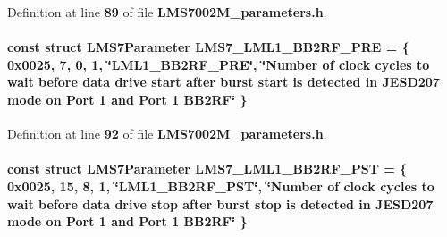 Definition at line {\bf 89} of file {\bf L\+M\+S7002\+M\+\_\+parameters.\+h}.

\paragraph[{L\+M\+S7\+\_\+\+L\+M\+L1\+\_\+\+B\+B2\+R\+F\+\_\+\+P\+RE}]{\setlength{\rightskip}{0pt plus 5cm}const struct {\bf L\+M\+S7\+Parameter} L\+M\+S7\+\_\+\+L\+M\+L1\+\_\+\+B\+B2\+R\+F\+\_\+\+P\+RE = \{ 0x0025, 7, 0, 1, \char`\"{}\+L\+M\+L1\+\_\+\+B\+B2\+R\+F\+\_\+\+P\+R\+E\char`\"{}, \char`\"{}\+Number of clock cycles to wait before data drive start after burst start is detected in J\+E\+S\+D207 mode on Port 1 and Port 1 B\+B2\+R\+F\char`\"{} \}\hspace{0.3cm}{\ttfamily [static]}}\label{LMS7002M__parameters_8h_ad5e434c054860dbf4ef419d4411698bf}


Definition at line {\bf 92} of file {\bf L\+M\+S7002\+M\+\_\+parameters.\+h}.

\paragraph[{L\+M\+S7\+\_\+\+L\+M\+L1\+\_\+\+B\+B2\+R\+F\+\_\+\+P\+ST}]{\setlength{\rightskip}{0pt plus 5cm}const struct {\bf L\+M\+S7\+Parameter} L\+M\+S7\+\_\+\+L\+M\+L1\+\_\+\+B\+B2\+R\+F\+\_\+\+P\+ST = \{ 0x0025, 15, 8, 1, \char`\"{}\+L\+M\+L1\+\_\+\+B\+B2\+R\+F\+\_\+\+P\+S\+T\char`\"{}, \char`\"{}\+Number of clock cycles to wait before data drive stop after burst stop is detected in J\+E\+S\+D207 mode on Port 1 and Port 1 B\+B2\+R\+F\char`\"{} \}\hspace{0.3cm}{\ttfamily [static]}}\label{LMS7002M__parameters_8h_ab8bc27c78dd3dfe920299b2b3e96b8e4}


